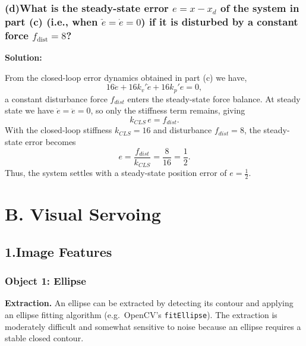 \documentclass[a4paper,12pt]{article}
\begin{document}


\subsubsection*{(d)What is the steady-state error $e = x - x_d$ of the system in part (c)  (i.e., when $\ddot{e} = \dot{e} = 0$) if it is disturbed by a constant force $f_{\text{dist}} = 8$?}  
\textbf{Solution:}

From the closed-loop error dynamics obtained in part (c) we have,
\[
16\ddot{e} + 16k_v' \dot{e} + 16k_p' e = 0,
\]
a constant disturbance force \(f_{dist}\) enters the steady-state force balance.
At steady state we have \(\dot{e} = \ddot{e} = 0\), so only the stiffness term
remains, giving
\[
k_{CLS} \, e = f_{dist}.
\]
With the closed-loop stiffness \(k_{CLS}=16\) and disturbance \(f_{dist}=8\),
the steady-state error becomes
\[
e = \frac{f_{dist}}{k_{CLS}}
  = \frac{8}{16}
  = \frac{1}{2}.
\]
Thus, the system settles with a steady-state position error of \(e = \tfrac{1}{2}\).

\section*{B. Visual Servoing}
\subsection*{1.Image Features}
\subsubsection*{Object 1: Ellipse}

\textbf{Extraction.}
An ellipse can be extracted by detecting its contour and applying an ellipse
fitting algorithm (e.g.\ OpenCV's \texttt{fitEllipse}).  
The extraction is moderately difficult and somewhat sensitive to noise because an ellipse requires a stable closed contour.
\end{document}
